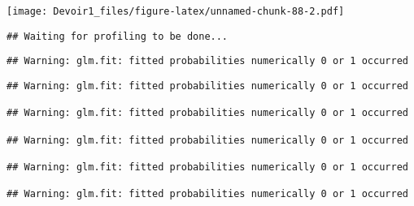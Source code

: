\documentclass[]{article}
\newenvironment{Shaded}{\begin{snugshade}}{\end{snugshade}}
\newcommand{\KeywordTok}[1]{\textcolor[rgb]{0.13,0.29,0.53}{\textbf{#1}}}
\newcommand{\DataTypeTok}[1]{\textcolor[rgb]{0.13,0.29,0.53}{#1}}
\newcommand{\DecValTok}[1]{\textcolor[rgb]{0.00,0.00,0.81}{#1}}
\newcommand{\StringTok}[1]{\textcolor[rgb]{0.31,0.60,0.02}{#1}}
\newcommand{\OperatorTok}[1]{\textcolor[rgb]{0.81,0.36,0.00}{\textbf{#1}}}
\newcommand{\NormalTok}[1]{#1}
\begin{document}
\texttt{[image: Devoir1\_files/figure-latex/unnamed-chunk-88-2.pdf]}

\begin{Shaded}
\end{Shaded}

\begin{verbatim}
## Waiting for profiling to be done...
\end{verbatim}

\begin{verbatim}
## Warning: glm.fit: fitted probabilities numerically 0 or 1 occurred
\end{verbatim}

\begin{verbatim}
## Warning: glm.fit: fitted probabilities numerically 0 or 1 occurred

## Warning: glm.fit: fitted probabilities numerically 0 or 1 occurred

## Warning: glm.fit: fitted probabilities numerically 0 or 1 occurred

## Warning: glm.fit: fitted probabilities numerically 0 or 1 occurred

## Warning: glm.fit: fitted probabilities numerically 0 or 1 occurred
\end{verbatim}
\end{document}
